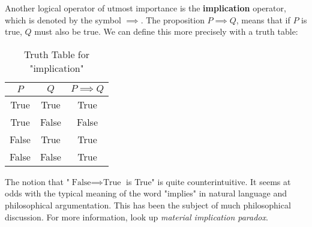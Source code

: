 Another logical operator of utmost importance is the \textbf{implication} operator,
which is denoted by the symbol \( \implies \). The proposition \( P \implies Q \),
means that if \( P \) is true, \( Q \) must also be true. We can define this more precisely
with a truth table:
\begin{table}[H]
  \centering
  \begin{tabular}{ccc}
    \toprule
    \(P\) & \(Q\) & \( P \implies Q \)  \\
    \midrule
    True & True & True \\
    True & False & False \\
    False & True & True \\
    False & False & True \\
    \bottomrule
  \end{tabular}
  \caption{Truth Table for "implication"}
\end{table}

\begin{advancedTopic}
  The notion that "\( \text{False} \implies \text{True} \) is True" is quite
  counterintuitive. It seems at odds with the typical meaning of the word "implies" in
  natural language and philosophical argumentation. This has been the subject of
  much philosophical discussion. For more information, look up \emph{material
  implication paradox}.
\end{advancedTopic}



